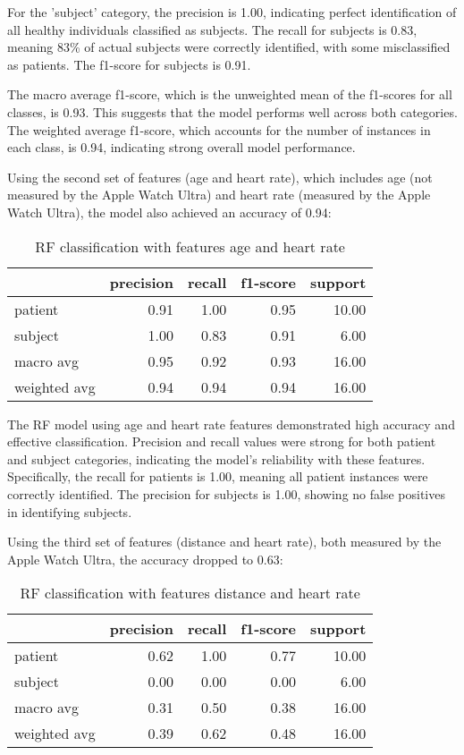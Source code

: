 For the 'subject' category, the precision is 1.00, indicating perfect identification of all healthy individuals classified as subjects. The recall for subjects is 0.83, meaning 83\% of actual subjects were correctly identified, with some misclassified as patients. The f1-score for subjects is 0.91.

The macro average f1-score, which is the unweighted mean of the f1-scores for all classes, is 0.93. This suggests that the model performs well across both categories. The weighted average f1-score, which accounts for the number of instances in each class, is 0.94, indicating strong overall model performance.

Using the second set of features (age and heart rate), which includes age (not measured by the Apple Watch Ultra) and heart rate (measured by the Apple Watch Ultra), the model also achieved an accuracy of 0.94:

\FloatBarrier
\begin{table}[H]
\centering
\begin{tabular}{lrrrr}
\toprule
{} & precision & recall & f1-score & support \\
\midrule
patient & 0.91 & 1.00 & 0.95 & 10.00 \\
subject & 1.00 & 0.83 & 0.91 & 6.00 \\
macro avg & 0.95 & 0.92 & 0.93 & 16.00 \\
weighted avg & 0.94 & 0.94 & 0.94 & 16.00 \\
\bottomrule
\end{tabular}
\caption{RF classification with features age and heart rate}
\label{table:RFageHeartrate}
\end{table}
\FloatBarrier

The RF model using age and heart rate features demonstrated high accuracy and effective classification. Precision and recall values were strong for both patient and subject categories, indicating the model's reliability with these features. Specifically, the recall for patients is 1.00, meaning all patient instances were correctly identified. The precision for subjects is 1.00, showing no false positives in identifying subjects.

Using the third set of features (distance and heart rate), both measured by the Apple Watch Ultra, the accuracy dropped to 0.63:

\FloatBarrier
\begin{table}[H]
\centering
\begin{tabular}{lrrrr}
\toprule
{} & precision & recall & f1-score & support \\
\midrule
patient & 0.62 & 1.00 & 0.77 & 10.00 \\
subject & 0.00 & 0.00 & 0.00 & 6.00 \\
macro avg & 0.31 & 0.50 & 0.38 & 16.00 \\
weighted avg & 0.39 & 0.62 & 0.48 & 16.00 \\
\bottomrule
\end{tabular}
\caption{RF classification with features distance and heart rate}
\label{table:RFdistHeartrate}
\end{table}
\FloatBarrier

